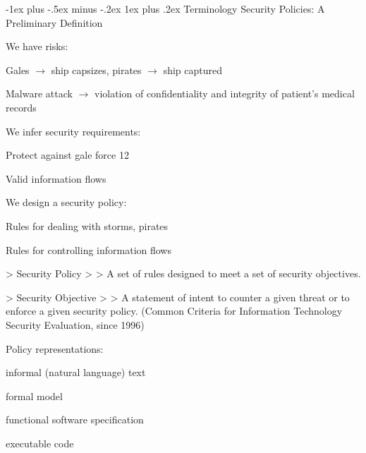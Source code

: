 \documentclass[a4paper]{article}
\makeatletter
\renewcommand{\subsubsection}{\@startsection{subsubsection}{3}{0mm}%
                                {-1ex plus -.5ex minus -.2ex}%
                                {1ex plus .2ex}%
                                {\normalfont\small\bfseries}}
\makeatother
\begin{document}
\begin{multicols}{3}
    \subsubsection{Terminology}
    Security Policies: A Preliminary Definition
    \begin{itemize*}
        \item We have risks:
              \begin{itemize*}
                  \item Gales $\rightarrow$  ship capsizes, pirates $\rightarrow$  ship captured
                  \item Malware attack $\rightarrow$  violation of confidentiality and integrity of patient’s medical records
              \end{itemize*}
        \item We infer security requirements:
              \begin{itemize*}
                  \item Protect against gale force 12
                  \item Valid information flows
              \end{itemize*}
        \item We design a security policy:
              \begin{itemize*}
                  \item Rules for dealing with storms, pirates
                  \item Rules for controlling information flows
              \end{itemize*}
    \end{itemize*}

    > Security Policy
    >
    > A set of rules designed to meet a set of security objectives.

    > Security Objective
    >
    > A statement of intent to counter a given threat or to enforce a given security
    policy.
    (Common Criteria for Information Technology Security Evaluation, since 1996)

    Policy representations:
    \begin{itemize*}
        \item informal (natural language) text
        \item formal model
        \item functional software specification
        \item executable code
    \end{itemize*}


\end{multicols}
\end{document}
